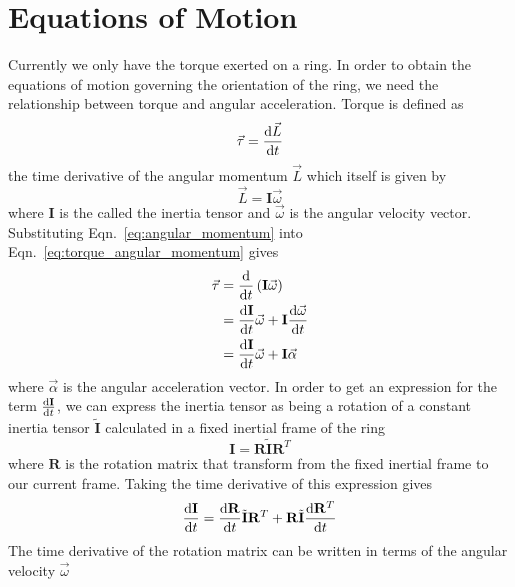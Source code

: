 \section{Equations of Motion}
Currently we only have the torque exerted on a ring. In order to obtain the equations of motion governing the orientation of the
ring, we need the relationship between torque and angular acceleration. Torque is defined as
\begin{equation}
    \vec{\tau} = \frac{\textrm{d}\vec{L}}{\textrm{d} t}\label{eq:torque_angular_momentum}
\end{equation}
the time derivative of the angular momentum \( \vec{L} \) which itself is given by
\begin{equation}
    \vec{L} = \mathbf{I} \vec{\omega}\label{eq:angular_momentum}
\end{equation}
where \( \mathbf{I} \) is the called the inertia tensor and \( \vec{\omega} \) is the angular velocity vector.
Substituting Eqn.~\ref{eq:angular_momentum} into
Eqn.~\ref{eq:torque_angular_momentum} gives
\begin{align}
    \vec{\tau} & = \frac{\textrm{d}}{\textrm{d} t} \left(\mathbf{I} \vec{\omega}\right) \nonumber                                                 \\
               & = \frac{\textrm{d}\mathbf{I}}{\textrm{d} t} \vec{\omega} + \mathbf{I} \frac{\textrm{d}\vec{\omega}}{\textrm{d} t} \nonumber                           \\
               & = \frac{\textrm{d}\mathbf{I}}{\textrm{d} t} \vec{\omega} + \mathbf{I} \vec{\alpha} \label{eq:torque_angular_momentum_expression}
\end{align}
where \( \vec{\alpha} \) is the angular acceleration vector. In order to get an expression for the term \( \frac{\textrm{d}\mathbf{I}}{\textrm{d} t} \),
we can express the inertia tensor as being a rotation of a constant inertia tensor \( \tilde{\mathbf{I}} \) calculated in a fixed
inertial frame of the ring
\begin{equation}
    \mathbf{I} = \mathbf{R} \tilde{\mathbf{I}} {\mathbf{R}}^{T}
\end{equation}
where \( \mathbf{R} \) is the rotation matrix that transform from the fixed inertial frame to our current frame. Taking the time
derivative of this expression gives
\begin{align}
    \frac{\textrm{d}\mathbf{I}}{\textrm{d} t} =
    \frac{\textrm{d}\mathbf{R}}{\textrm{d} t} \tilde{\mathbf{I}} {\mathbf{R}}^{T}
    + \mathbf{R} \tilde{\mathbf{I}} \frac{\textrm{d}{\mathbf{R}}^{T}}{\textrm{d} t} \label{eq:inertia_tensor_time_derivative}
\end{align}
The time derivative of the rotation matrix can be written in terms of the angular velocity \( \vec{\omega} \)
